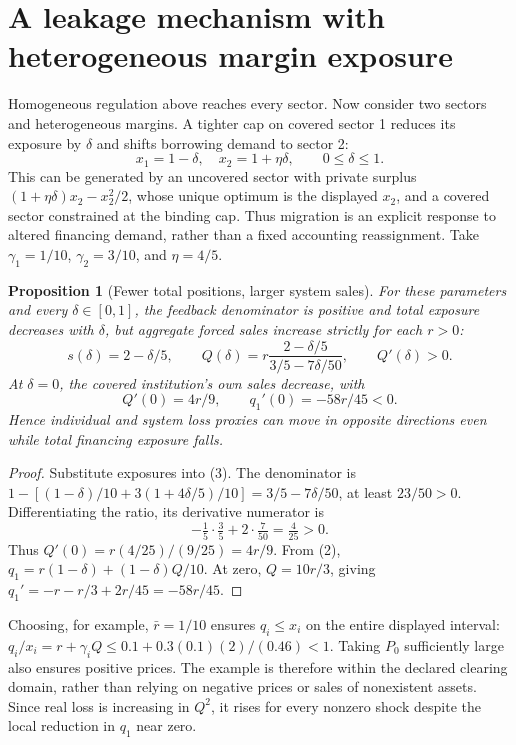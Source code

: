 \documentclass[11pt,a4paper]{article}
\newtheorem{proposition}[theorem]{Proposition}
\theoremstyle{remark}
\begin{document}
\section{A leakage mechanism with heterogeneous margin exposure}
Homogeneous regulation above reaches every sector. Now consider two sectors and heterogeneous margins. A tighter cap on covered sector 1 reduces its exposure by $\delta$ and shifts borrowing demand to sector 2:
\[
 x_1=1-\delta,\quad x_2=1+\eta\delta,
 \qquad0\le\delta\le1.
\]
This can be generated by an uncovered sector with private surplus $(1+\eta\delta)x_2-x_2^2/2$, whose unique optimum is the displayed $x_2$, and a covered sector constrained at the binding cap. Thus migration is an explicit response to altered financing demand, rather than a fixed accounting reassignment. Take $\gamma_1=1/10$, $\gamma_2=3/10$, and $\eta=4/5$.

\begin{proposition}[Fewer total positions, larger system sales]
For these parameters and every $\delta\in[0,1]$, the feedback denominator is positive and total exposure decreases with $\delta$, but aggregate forced sales increase strictly for each $r>0$:
\[
 s(\delta)=2-\delta/5,\qquad
 Q(\delta)=r\frac{2-\delta/5}{3/5-7\delta/50},
 \qquad Q'(\delta)>0.
\]
At $\delta=0$, the covered institution's own sales decrease, with
\[
 Q'(0)=4r/9,\qquad q_1'(0)=-58r/45<0.
\]
Hence individual and system loss proxies can move in opposite directions even while total financing exposure falls.
\end{proposition}
\begin{proof}
Substitute exposures into (3). The denominator is $1-[(1-\delta)/10+3(1+4\delta/5)/10]=3/5-7\delta/50$, at least $23/50>0$. Differentiating the ratio, its derivative numerator is
\[
 -\tfrac15\cdot\tfrac35+2\cdot\tfrac7{50}=\tfrac4{25}>0.
\]
Thus $Q'(0)=r(4/25)/(9/25)=4r/9$. From (2), $q_1=r(1-\delta)+(1-\delta)Q/10$. At zero, $Q=10r/3$, giving $q_1'=-r-r/3+2r/45=-58r/45$.
\end{proof}

Choosing, for example, $\bar r=1/10$ ensures $q_i\le x_i$ on the entire displayed interval: $q_i/x_i=r+\gamma_iQ\le0.1+0.3(0.1)(2)/(0.46)<1$. Taking $P_0$ sufficiently large also ensures positive prices. The example is therefore within the declared clearing domain, rather than relying on negative prices or sales of nonexistent assets. Since real loss is increasing in $Q^2$, it rises for every nonzero shock despite the local reduction in $q_1$ near zero.
\end{document}
